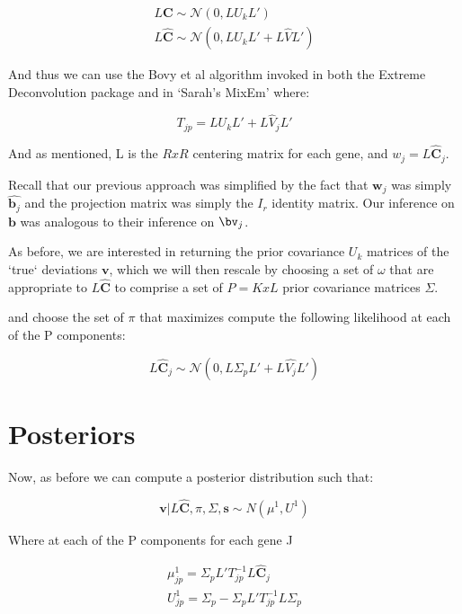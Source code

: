 \documentclass[11pt, oneside]{article}   	%
\newcommand{\Norm}{{\mathcal{N}}} %
\newcommand{\ceff}{\bm{C}}
\newcommand{\chat}{\bm{\hat{C}}}
\newcommand{\vb}{\bm{v}}
\def\L{L}
\begin{document}
\begin{itemize}
\begin{equation}
\begin{aligned}
\label{maxlike}
L \ceff \sim \Norm (0, L U_{k} L') \\
L \chat \sim \Norm (0, L U_{k} L' + L\hat{V} L') 
\end{aligned}
\end{equation}

And thus we can use the Bovy et al algorithm invoked in both the Extreme Deconvolution package and in `Sarah's MixEm' where:

\begin{equation}
 T_{jp} = L U_k L' + L\hat{V}_{j} L'
\end{equation}

And as mentioned, L is the $RxR$ centering matrix for each gene, and $w_{j} = L \chat_{j}$.

Recall that our previous approach was simplified by the fact that $\bm{w}_{j}$ was simply $\hat{\bm{b}_{j}}$ and the projection matrix was simply the $I_{r}$ identity matrix. Our inference on $\bm{b}$ was analogous to their inference on $\bv_{j}$. 


As before, we are interested in returning the prior covariance $U_k$ matrices of the `true` deviations $\vb$, which we will then rescale by choosing a set of $\omega$ that are appropriate to $L \chat $ to comprise a set of $P = KxL$ prior covariance matrices $\Sigma$.

and choose the set of $\pi$ that maximizes compute the following likelihood at each of the P components: 

\begin{equation}
L \chat _j \sim \Norm (0, L \Sigma_{p} L' + L\hat{V_j} L') 
\end{equation}
 

\section{Posteriors}

Now, as before we can compute a posterior distribution such that:

\begin{equation}
\vb | \L \chat, \pi, \Sigma, \bm{s} \sim N(\mu^{1} , U^{1})
\end{equation}

Where at each of the P components for each gene J 

\begin{equation}
\begin{aligned}
\mu^{1}_{jp} = \Sigma_{p} L' T_{jp}^{-1} L \chat_{j} \\
U^{1}_{jp} = \Sigma_{p} - \Sigma_p L' T_{jp}^{-1} L \Sigma_{p}
\end{aligned}
\end{equation}


\end{itemize}
\end{document}
